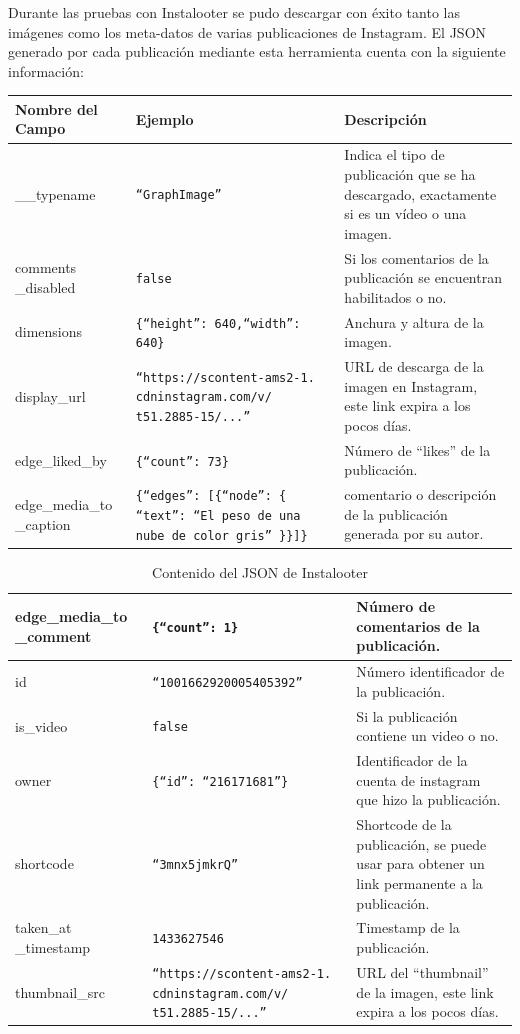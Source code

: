 Durante las pruebas con Instalooter se pudo descargar con éxito tanto las imágenes como los meta-datos de varias publicaciones de Instagram. El JSON generado por cada publicación mediante esta herramienta cuenta con la siguiente información:

\begin{table}[H]
    \hspace*{-1.5cm}
    \centering
    \begin{tabular}{|p{}|p{}|p{}|}
    \hline
    Nombre del Campo & Ejemplo & Descripción \\ \hline
    \_\_typename & \texttt{``GraphImage''} & Indica el tipo de publicación que se ha descargado, exactamente si es un vídeo o una imagen. \\ \hline
    comments \_disabled & \texttt{false} & Si los comentarios de la publicación se encuentran habilitados o no. \\ \hline
    dimensions & \texttt{\{``height'': 640,``width'': 640\}} & Anchura y altura de la imagen. \\ \hline
    display\_url & \texttt{``https://scontent-ams2-1.
    cdninstagram.com/v/ t51.2885-15/...''} & URL de descarga de la imagen en Instagram, este link expira a los pocos días. \\ \hline
    edge\_liked\_by & \texttt{\{``count'': 73\}} & Número de ``likes'' de la publicación. \\ \hline
    edge\_media\_to \_caption & \texttt{\{``edges'': {[}\{``node'': \{ ``text'': ``El peso de una nube de color gris'' \}\}{]}\}} & comentario o descripción de la publicación generada por su autor. \\ \hline
    \end{tabular}
\end{table}
\begin{table}[H]
    \centering
    \begin{tabular}{|p{}|p{}|p{}|}
    \hline
    edge\_media\_to \_comment & \texttt{\{``count'': 1\}} & Número de comentarios de la publicación. \\ \hline
    id & \texttt{``1001662920005405392''} & Número identificador de la publicación. \\ \hline
    is\_video & \texttt{false} & Si la publicación contiene un video o no. \\ \hline
    owner & \texttt{\{``id'': ``216171681''\}} & Identificador de la cuenta de instagram que hizo la publicación. \\ \hline
    shortcode & \texttt{``3mnx5jmkrQ''} & Shortcode de la publicación, se puede usar para obtener un link permanente a la publicación. \\ \hline
    taken\_at \_timestamp & \texttt{1433627546} & Timestamp de la publicación. \\ \hline
    thumbnail\_src & \texttt{``https://scontent-ams2-1.
    cdninstagram.com/v/ t51.2885-15/...'' }& URL del ``thumbnail'' de la imagen, este link expira a los pocos días. \\ \hline
    \end{tabular}
    \caption{Contenido del JSON de Instalooter}
    \label{tab:json_instalooter}
\end{table}

